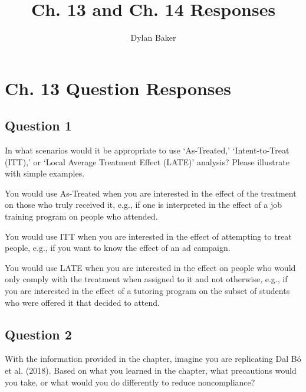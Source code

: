 \documentclass[10pt]{article}
\title{Ch. 13 and Ch. 14 Responses}
\author{Dylan Baker}
\begin{document}
\maketitle

\tableofcontents

\section{Ch. 13 Question Responses}

\subsection{Question 1}

In what scenarios would it be appropriate to use `As-Treated,' `Intent-to-Treat (ITT),' or `Local Average Treatment Effect (LATE)' analysis? 
Please illustrate with simple examples.

\hrulefill\hspace{0.5em}\dotfill\hspace{0.5em}\hrulefill

You would use As-Treated when you are interested in the effect 
of the treatment on those who truly received it, e.g., 
if one is interpreted in the effect of a job training program 
on people who attended.

You would use ITT when you are interested in the effect of 
attempting to treat people, e.g., if you want to know 
the effect of an ad campaign.

You would use LATE when you are interested in the effect 
on people who would only comply with the treatment
when assigned to it and not otherwise, e.g., if you 
are interested in the effect of a tutoring program 
on the subset of students who were offered it that 
decided to attend. 


\subsection{Question 2}

With the information provided in the chapter, imagine 
you are replicating Dal Bó et al. (2018). Based on what 
you learned in the chapter, what precautions would you 
take, or what would you do differently to reduce noncompliance?

\hrulefill\hspace{0.5em}\dotfill\hspace{0.5em}\hrulefill
\end{document}
